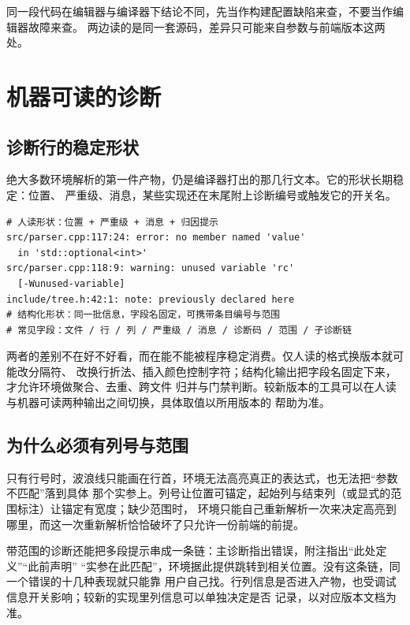 \documentclass[12pt,a4paper,fontset=fandol]{ctexbook}
\begin{document}
\begin{guideline}[title={判定归属的一句话}]
同一段代码在编辑器与编译器下结论不同，先当作构建配置缺陷来查，不要当作编辑器故障来查。
两边读的是同一套源码，差异只可能来自参数与前端版本这两处。
\end{guideline}

\section{机器可读的诊断}\label{sec:cl14-diagnostics}

\subsection{诊断行的稳定形状}\label{sec:cl14-diag-shape}

绝大多数环境解析的第一件产物，仍是编译器打出的那几行文本。它的形状长期稳定：位置、
严重级、消息，某些实现还在末尾附上诊断编号或触发它的开关名。

\begin{lstlisting}[style=outstyle, caption={诊断行的两种形状（示意，非本仓库实测）}]
# 人读形状：位置 + 严重级 + 消息 + 归因提示
src/parser.cpp:117:24: error: no member named 'value'
  in 'std::optional<int>'
src/parser.cpp:118:9: warning: unused variable 'rc'
  [-Wunused-variable]
include/tree.h:42:1: note: previously declared here
# 结构化形状：同一批信息，字段名固定，可携带条目编号与范围
# 常见字段：文件 / 行 / 列 / 严重级 / 消息 / 诊断码 / 范围 / 子诊断链
\end{lstlisting}

两者的差别不在好不好看，而在能不能被程序稳定消费。仅人读的格式换版本就可能改分隔符、
改换行折法、插入颜色控制字符；结构化输出把字段名固定下来，才允许环境做聚合、去重、跨文件
归并与门禁判断。较新版本的工具可以在人读与机器可读两种输出之间切换，具体取值以所用版本的
帮助为准。

\subsection{为什么必须有列号与范围}\label{sec:cl14-column-range}

只有行号时，波浪线只能画在行首，环境无法高亮真正的表达式，也无法把“参数不匹配”落到具体
那个实参上。列号让位置可锚定，起始列与结束列（或显式的范围标注）让锚定有宽度；缺少范围时，
环境只能自己重新解析一次来决定高亮到哪里，而这一次重新解析恰恰破坏了只允许一份前端的前提。

带范围的诊断还能把多段提示串成一条链：主诊断指出错误，附注指出“此处定义”“此前声明”
“实参在此匹配”，环境据此提供跳转到相关位置。没有这条链，同一个错误的十几种表现就只能靠
用户自己找。行列信息是否进入产物，也受调试信息开关影响；较新的实现里列信息可以单独决定是否
记录，以对应版本文档为准。
\end{document}
